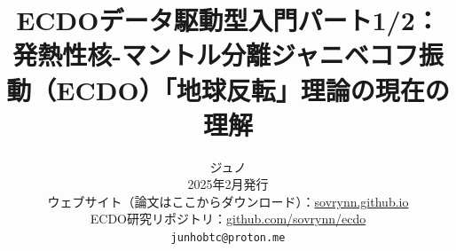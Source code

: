\documentclass[10pt,twocolumn,letterpaper]{article}
\begin{document}
\title{ECDOデータ駆動型入門パート1/2：発熱性核-マントル分離ジャニベコフ振動（ECDO）「地球反転」理論の現在の理解}

\author{ジュノ\\
2025年2月発行\\
ウェブサイト（論文はここからダウンロード）：\href{https://sovrynn.github.io}{sovrynn.github.io}\\
ECDO研究リポジトリ：\href{https://github.com/sovrynn/ecdo}{github.com/sovrynn/ecdo}\\
{\tt\small junhobtc@proton.me}
}

\maketitle
\end{document}
